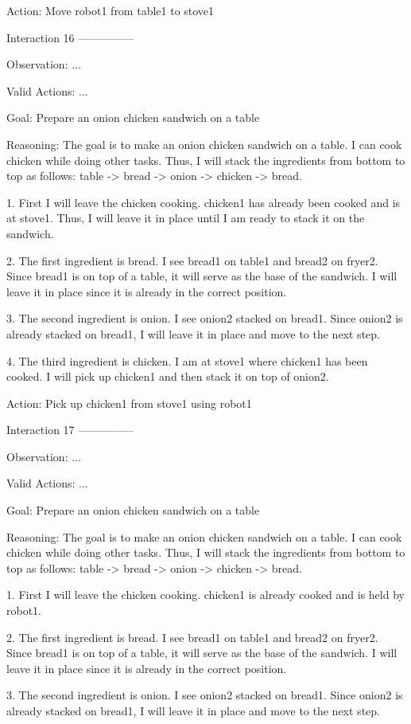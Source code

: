 Action: Move robot1 from table1 to stove1


Interaction 16
---------------


Observation: ...

Valid Actions: ...

Goal: Prepare an onion chicken sandwich on a table


Reasoning: The goal is to make an onion chicken sandwich on a table. I can cook chicken while doing other tasks. Thus, I
will stack the ingredients from bottom to top as follows: table -> bread -> onion -> chicken -> bread.

1. First I will leave the chicken cooking. chicken1 has already been cooked and is at stove1. Thus, I will leave it in place until I am ready to stack it on the sandwich.

2. The first ingredient is bread. I see bread1 on table1 and bread2 on fryer2. Since bread1 is on top of a table, it will serve as the base of the sandwich. I will leave it in place since it is already in the correct position.

3. The second ingredient is onion. I see onion2 stacked on bread1. Since onion2 is already stacked on bread1, I will leave it in place and move to the next step.

4. The third ingredient is chicken. I am at stove1 where chicken1 has been cooked. I will pick up chicken1 and then stack it on top of onion2.

Action: Pick up chicken1 from stove1 using robot1


Interaction 17
---------------


Observation: ...

Valid Actions: ...

Goal: Prepare an onion chicken sandwich on a table


Reasoning: The goal is to make an onion chicken sandwich on a table. I can cook chicken while doing other tasks. Thus, I
will stack the ingredients from bottom to top as follows: table -> bread -> onion -> chicken -> bread.

1. First I will leave the chicken cooking. chicken1 is already cooked and is held by robot1.

2. The first ingredient is bread. I see bread1 on table1 and bread2 on fryer2. Since bread1 is on top of a table, it will serve as the base of the sandwich. I will leave it in place since it is already in the correct position.

3. The second ingredient is onion. I see onion2 stacked on bread1. Since onion2 is already stacked on bread1, I will leave it in place and move to the next step.

